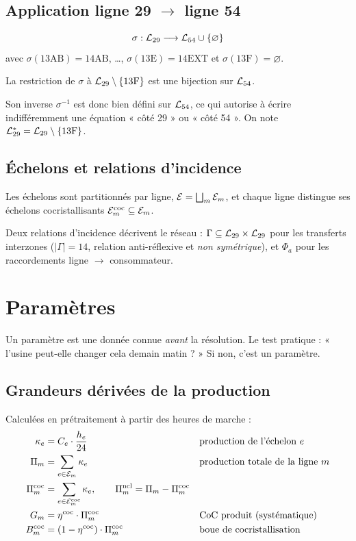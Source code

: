 \subsection{Application ligne 29 $\to$ ligne 54}

\begin{equation}
\sigma : \mathcal{L}_{29} \longrightarrow \mathcal{L}_{54} \cup \{\varnothing\}
\end{equation}
avec $\sigma(\text{13AB}) = \text{14AB}$, \dots, $\sigma(\text{13E}) = \text{14EXT}$ et
$\sigma(\text{13F}) = \varnothing$.

\begin{proposition}
La restriction de $\sigma$ à $\mathcal{L}_{29} \setminus \{\text{13F}\}$ est une bijection sur
$\mathcal{L}_{54}$.
\end{proposition}

Son inverse $\sigma^{-1}$ est donc bien défini sur $\mathcal{L}_{54}$, ce qui autorise à écrire
indifféremment une équation « côté 29 » ou « côté 54 ». On note
$\mathcal{L}^{\ast}_{29} = \mathcal{L}_{29} \setminus \{\text{13F}\}$.

\subsection{Échelons et relations d'incidence}

Les échelons sont partitionnés par ligne, $\mathcal{E} = \bigsqcup_{m} \mathcal{E}_m$, et chaque ligne
distingue ses échelons cocristallisants $\mathcal{E}^{\mathrm{coc}}_m \subseteq \mathcal{E}_m$.

Deux relations d'incidence décrivent le réseau : $\Gamma \subseteq \mathcal{L}_{29} \times
\mathcal{L}_{29}$ pour les transferts interzones ($|\Gamma| = 14$, relation anti-réflexive et
\emph{non symétrique}), et $\Phi_a$ pour les raccordements ligne $\to$ consommateur.

\section{Paramètres}

Un paramètre est une donnée connue \emph{avant} la résolution. Le test pratique :
« l'usine peut-elle changer cela demain matin ? » Si non, c'est un paramètre.

\subsection{Grandeurs dérivées de la production}

Calculées en prétraitement à partir des heures de marche :
\begin{align}
\kappa_e &= C_e \cdot \frac{h_e}{24} && \text{production de l'échelon } e \\
\Pi_m &= \sum_{e \in \mathcal{E}_m} \kappa_e && \text{production totale de la ligne } m \\
\Pi^{\mathrm{coc}}_m &= \sum_{e \in \mathcal{E}^{\mathrm{coc}}_m} \kappa_e,
\qquad \Pi^{\mathrm{ncl}}_m = \Pi_m - \Pi^{\mathrm{coc}}_m \\
G_m &= \eta^{\mathrm{coc}} \cdot \Pi^{\mathrm{coc}}_m && \text{CoC produit (systématique)} \\
B^{\mathrm{coc}}_m &= (1 - \eta^{\mathrm{coc}}) \cdot \Pi^{\mathrm{coc}}_m && \text{boue de cocristallisation}
\end{align}

